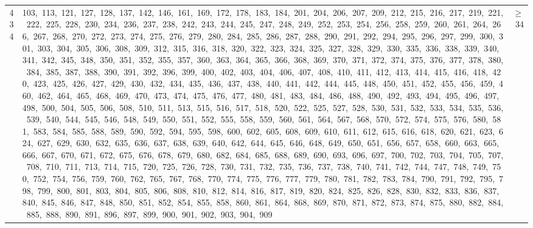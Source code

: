 \begin{longtable}{c|p{}|r}
434 & 103,\ 113,\ 121,\ 127,\ 128,\ 137,\ 142,\ 146,\ 161,\ 169,\ 172,\ 178,\ 183,\ 184,\ 201,\ 204,\ 206,\ 207,\ 209,\ 212,\ 215,\ 216,\ 217,\ 219,\ 221,\ 222,\ 225,\ 228,\ 230,\ 234,\ 236,\ 237,\ 238,\ 242,\ 243,\ 244,\ 245,\ 247,\ 248,\ 249,\ 252,\ 253,\ 254,\ 256,\ 258,\ 259,\ 260,\ 261,\ 264,\ 266,\ 267,\ 268,\ 270,\ 272,\ 273,\ 274,\ 275,\ 276,\ 279,\ 280,\ 284,\ 285,\ 286,\ 287,\ 288,\ 290,\ 291,\ 292,\ 294,\ 295,\ 296,\ 297,\ 299,\ 300,\ 301,\ 303,\ 304,\ 305,\ 306,\ 308,\ 309,\ 312,\ 315,\ 316,\ 318,\ 320,\ 322,\ 323,\ 324,\ 325,\ 327,\ 328,\ 329,\ 330,\ 335,\ 336,\ 338,\ 339,\ 340,\ 341,\ 342,\ 345,\ 348,\ 350,\ 351,\ 352,\ 355,\ 357,\ 360,\ 363,\ 364,\ 365,\ 366,\ 368,\ 369,\ 370,\ 371,\ 372,\ 374,\ 375,\ 376,\ 377,\ 378,\ 380,\ 384,\ 385,\ 387,\ 388,\ 390,\ 391,\ 392,\ 396,\ 399,\ 400,\ 402,\ 403,\ 404,\ 406,\ 407,\ 408,\ 410,\ 411,\ 412,\ 413,\ 414,\ 415,\ 416,\ 418,\ 420,\ 423,\ 425,\ 426,\ 427,\ 429,\ 430,\ 432,\ 434,\ 435,\ 436,\ 437,\ 438,\ 440,\ 441,\ 442,\ 444,\ 445,\ 448,\ 450,\ 451,\ 452,\ 455,\ 456,\ 459,\ 460,\ 462,\ 464,\ 465,\ 468,\ 469,\ 470,\ 473,\ 474,\ 475,\ 476,\ 477,\ 480,\ 481,\ 483,\ 484,\ 486,\ 488,\ 490,\ 492,\ 493,\ 494,\ 495,\ 496,\ 497,\ 498,\ 500,\ 504,\ 505,\ 506,\ 508,\ 510,\ 511,\ 513,\ 515,\ 516,\ 517,\ 518,\ 520,\ 522,\ 525,\ 527,\ 528,\ 530,\ 531,\ 532,\ 533,\ 534,\ 535,\ 536,\ 539,\ 540,\ 544,\ 545,\ 546,\ 548,\ 549,\ 550,\ 551,\ 552,\ 555,\ 558,\ 559,\ 560,\ 561,\ 564,\ 567,\ 568,\ 570,\ 572,\ 574,\ 575,\ 576,\ 580,\ 581,\ 583,\ 584,\ 585,\ 588,\ 589,\ 590,\ 592,\ 594,\ 595,\ 598,\ 600,\ 602,\ 605,\ 608,\ 609,\ 610,\ 611,\ 612,\ 615,\ 616,\ 618,\ 620,\ 621,\ 623,\ 624,\ 627,\ 629,\ 630,\ 632,\ 635,\ 636,\ 637,\ 638,\ 639,\ 640,\ 642,\ 644,\ 645,\ 646,\ 648,\ 649,\ 650,\ 651,\ 656,\ 657,\ 658,\ 660,\ 663,\ 665,\ 666,\ 667,\ 670,\ 671,\ 672,\ 675,\ 676,\ 678,\ 679,\ 680,\ 682,\ 684,\ 685,\ 688,\ 689,\ 690,\ 693,\ 696,\ 697,\ 700,\ 702,\ 703,\ 704,\ 705,\ 707,\ 708,\ 710,\ 711,\ 713,\ 714,\ 715,\ 720,\ 725,\ 726,\ 728,\ 730,\ 731,\ 732,\ 735,\ 736,\ 737,\ 738,\ 740,\ 741,\ 742,\ 744,\ 747,\ 748,\ 749,\ 750,\ 752,\ 754,\ 756,\ 759,\ 760,\ 762,\ 765,\ 767,\ 768,\ 770,\ 774,\ 775,\ 776,\ 777,\ 779,\ 780,\ 781,\ 782,\ 783,\ 784,\ 790,\ 791,\ 792,\ 795,\ 798,\ 799,\ 800,\ 801,\ 803,\ 804,\ 805,\ 806,\ 808,\ 810,\ 812,\ 814,\ 816,\ 817,\ 819,\ 820,\ 824,\ 825,\ 826,\ 828,\ 830,\ 832,\ 833,\ 836,\ 837,\ 840,\ 845,\ 846,\ 847,\ 848,\ 850,\ 851,\ 852,\ 854,\ 855,\ 858,\ 860,\ 861,\ 864,\ 868,\ 869,\ 870,\ 871,\ 872,\ 873,\ 874,\ 875,\ 880,\ 882,\ 884,\ 885,\ 888,\ 890,\ 891,\ 896,\ 897,\ 899,\ 900,\ 901,\ 902,\ 903,\ 904,\ 909 & $\ge$ 34 \\

\end{longtable}
